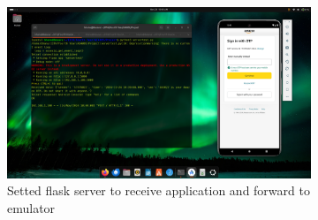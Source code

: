 \documentclass[a4paper,12pt]{article}
\begin{document}
\begin{figure}[h]
    \centering
    \begin{subfigure}[b]{0.75\textwidth}
        \includegraphics[width=\textwidth]{../images/sms-received-demo.png}
        \caption{Setted flask server to receive application and forward to emulator}
    \end{subfigure}
    \hfill
    \begin{subfigure}[b]{0.2\textwidth}

\end{subfigure}
\end{figure}
\end{document}

